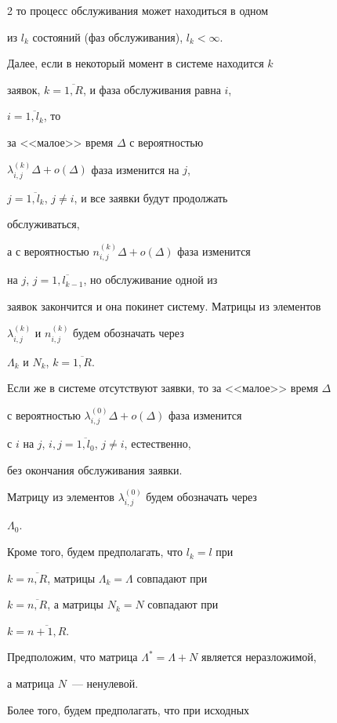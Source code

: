 \begin{multicols}{2}
то процесс обслуживания может находиться в одном


из $l_k$  состояний (фаз обслуживания), $l_k<\infty$.


Далее, если в некоторый момент в системе находится $k$


 заявок, $k = \overline{1,R}$, и фаза обслуживания равна $i$,


$i=\overline{1,l_k}$, то


за <<малое>> время $\Delta$ с вероятностью


$\lambda^{(k)}_{i,j}\Delta + o(\Delta)$ фаза изменится на $j$,


$j=\overline{1,l_k}$, $j\ne i$, и все заявки будут продолжать


обслуживаться,


а с вероятностью $n^{(k)}_{i,j}\Delta + o(\Delta)$ фаза изменится


на $j$, $j=\overline{1,l_{k-1}}$, но обслуживание одной из


заявок закончится и она покинет систему. Матрицы из элементов


$\lambda^{(k)}_{i,j}$ и $n^{(k)}_{i,j}$ будем обозначать через


$\Lambda_k$ и $N_k$, $k =\overline{1,R}$.


Если же в системе отсутствуют заявки, то за <<малое>> время $\Delta$


с вероятностью $\lambda^{(0)}_{i,j}\Delta + o(\Delta)$ фаза изменится


с $i$ на $j$, $i,j=\overline{1,l_0}$, $j\ne i$, естественно,


без окончания обслуживания заявки.


Матрицу из элементов $\lambda^{(0)}_{i,j}$ будем обозначать через


$\Lambda_0$.





Кроме того, будем предполагать, что $l_k=l$ при


$k =\overline{n,R}$, матрицы $\Lambda_k = \Lambda$ совпадают при


$k =\overline{n,R}$, а матрицы $N_k = N$ совпадают при


$k =\overline{n+1,R}$.





Предположим, что матрица $\Lambda^* = \Lambda+N$ является неразложимой,


а матрица $N$~--- ненулевой.


Более того, будем предполагать, что при исходных



\end{multicols}
